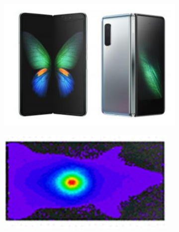 \begin{figure}[h]
    \begin{subfigure}[t]{.43\textwidth}
        \centering
        \includegraphics[width=\textwidth]{pictures/folding_oled_fold.PNG}
        \caption{}
    \end{subfigure}
    \hspace{0.5cm}
    \begin{subfigure}[t]{.43\textwidth}
        \centering
        \includegraphics[width=0.95\textwidth]{pictures/biological_oled.PNG}
        \caption{}
    \end{subfigure}
    

\end{figure}
